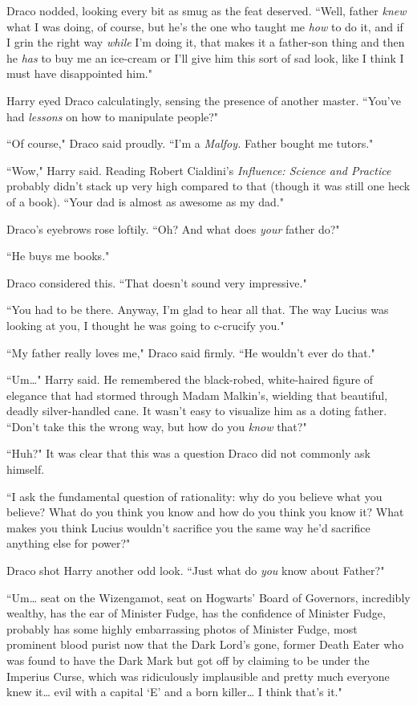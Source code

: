 Draco nodded, looking every bit as smug as the feat deserved. ``Well, father \emph{knew} what I was doing, of course, but he's the one who taught me \emph{how} to do it, and if I grin the right way \emph{while} I'm doing it, that makes it a father-son thing and then he \emph{has} to buy me an ice-cream or I'll give him this sort of sad look, like I think I must have disappointed him."

Harry eyed Draco calculatingly, sensing the presence of another master. ``You've had \emph{lessons} on how to manipulate people?"

``Of course," Draco said proudly. ``I'm a \emph{Malfoy.} Father bought me tutors."

``Wow," Harry said. Reading Robert Cialdini's \emph{Influence: Science and Practice} probably didn't stack up very high compared to that (though it was still one heck of a book). ``Your dad is almost as awesome as my dad."

Draco's eyebrows rose loftily. ``Oh? And what does \emph{your} father do?"

``He buys me books."

Draco considered this. ``That doesn't sound very impressive."

``You had to be there. Anyway, I'm glad to hear all that. The way Lucius was looking at you, I thought he was going to c-crucify you."

``My father really loves me," Draco said firmly. ``He wouldn't ever do that."

``Um{\ldots}" Harry said. He remembered the black-robed, white-haired figure of elegance that had stormed through Madam Malkin's, wielding that beautiful, deadly silver-handled cane. It wasn't easy to visualize him as a doting father. ``Don't take this the wrong way, but how do you \emph{know} that?"

``Huh?" It was clear that this was a question Draco did not commonly ask himself.

``I ask the fundamental question of rationality: why do you believe what you believe? What do you think you know and how do you think you know it? What makes you think Lucius wouldn't sacrifice you the same way he'd sacrifice anything else for power?"

Draco shot Harry another odd look. ``Just what do \emph{you} know about Father?"

``Um{\ldots} seat on the Wizengamot, seat on Hogwarts' Board of Governors, incredibly wealthy, has the ear of Minister Fudge, has the confidence of Minister Fudge, probably has some highly embarrassing photos of Minister Fudge, most prominent blood purist now that the Dark Lord's gone, former Death Eater who was found to have the Dark Mark but got off by claiming to be under the Imperius Curse, which was ridiculously implausible and pretty much everyone knew it{\ldots} evil with a capital `E' and a born killer{\ldots} I think that's it."

